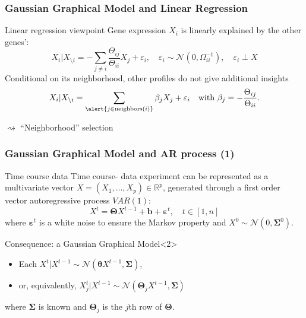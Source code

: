 \begin{frame}
  \frametitle{Gaussian Graphical Model and Linear Regression}

  \begin{block}{Linear regression viewpoint}
    Gene expression $X_i$ is linearly explained by the other genes':
    \begin{equation*}
      X_i | X_{ \setminus i} = - \sum_{j \neq i}
      \frac{\Theta_{ij}}{\Theta_{ii}} X_j + \varepsilon_i,\quad \varepsilon_i
      \sim \mathcal{N}(0,\Omega_{ii}^{-1}), \quad \varepsilon_i \perp X
      \end{equation*}
      Conditional  on its  neighborhood,  other profiles  do not  give
      additional insights
    \begin{equation*}
      X_i | X_{ \setminus i} = \sum_{\alert{j \in \text{neighbors}(i)}} \beta_j X_j + \varepsilon_i
      \quad         \text{with         }         \beta_j         =
      -\frac{\Theta_{ij}}{\Theta_{ii}}.
    \end{equation*}
  \end{block}

  \alert{$\rightsquigarrow$ ``Neighborhood'' selection}

\end{frame}


\begin{frame}
  \frametitle{Gaussian Graphical Model and AR process (1)}
  
  \begin{block}{Time course data}
    Time course- data experiment can  be  represented  as   a  multivariate  vector
    $X=(X_1,\dots,X_p)\in\mathbb{R}^p$,  generated  through a
    \alert{first order vector autoregressive} process $VAR(1)$:
    \begin{equation*}
      X^{t}   =   \boldsymbol\Theta   X^{t-1}   +   \mathbf{b}   +
      \boldsymbol\varepsilon^{t},\quad t \in [1,n]
    \end{equation*}
    where  $\boldsymbol\varepsilon^{t}$ is  a white  noise to  ensure  the Markov
    property and $X^{0} \sim \mathcal{N}(0, \boldsymbol\Sigma^0)$.
  \end{block}

   \vfill
 
   \begin{block}{Consequence: a Gaussian Graphical Model}<2>
     \begin{itemize}
     \item        Each       $X^{t}        |        X^{t-1}       \sim
       \mathcal{N}(\mathbf{\theta}X^{t-1}, \boldsymbol\Sigma)$, 
     \item  or,  equivalently,  $X_j^{t}  |  X^{t-1}  \sim
       \mathcal{N}(\boldsymbol\Theta_jX^{t-1}, \boldsymbol\Sigma)$
     \end{itemize}
     where $\boldsymbol\Sigma$ is known and $\boldsymbol\Theta_j$ is the
     $j$th row of $\boldsymbol\Theta$.
   \end{block}
 \end{frame}

